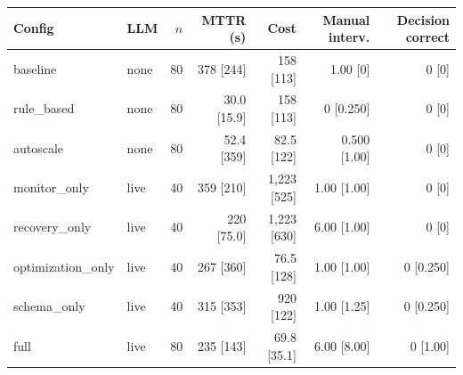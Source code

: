 \begin{tabular}{llrrrrr}
\toprule
Config & LLM & $n$ & MTTR (s) & Cost & Manual interv. & Decision correct \\
\midrule
baseline & none & 80 & 378 [244] & 158 [113] & 1.00 [0] & 0 [0] \\
rule\_based & none & 80 & 30.0 [15.9] & 158 [113] & 0 [0.250] & 0 [0] \\
autoscale & none & 80 & 52.4 [359] & 82.5 [122] & 0.500 [1.00] & 0 [0] \\
monitor\_only & live & 40 & 359 [210] & 1{,}223 [525] & 1.00 [1.00] & 0 [0] \\
recovery\_only & live & 40 & 220 [75.0] & 1{,}223 [630] & 6.00 [1.00] & 0 [0] \\
optimization\_only & live & 40 & 267 [360] & 76.5 [128] & 1.00 [1.00] & 0 [0.250] \\
schema\_only & live & 40 & 315 [353] & 920 [122] & 1.00 [1.25] & 0 [0.250] \\
full & live & 80 & 235 [143] & 69.8 [35.1] & 6.00 [8.00] & 0 [1.00] \\
\bottomrule
\end{tabular}
